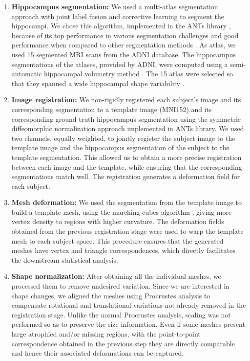 \begin{enumerate}
    \item \textbf{Hippocampus segmentation:} We used a multi-atlas segmentation approach with joint label fusion and corrective learning \cite{Wang2013} to segment the hippocampi. We chose this algorithm, implemented in the ANTs library \cite{Avants2009}, because of its top performance in various segmentation challenges \cite{Wang2013} and good performance when compared to other segmentation methods \cite{Dill2015}. As atlas, we used 15 segmented MRI scans from the ADNI database. The hippocampus segmentations of the atlases, provided by ADNI, were computed using a semi-automatic hippocampal volumetry method \cite{Hsu2002}. The 15 atlas were selected so that they spanned a wide hippocampal shape variability \cite{Sanroma2014}. \\
    
    \item \textbf{Image registration:} We non-rigidly registered each subject's image and its corresponding segmentation to a template image (MNI152) and its corresponding ground truth hippocampus segmentation using the symmetric diffeomorphic normalization approach \cite{Avants2008a} implemented in ANTs library. We used two channels, equally weighted, to jointly register the subject image to the template image and the hippocampus segmentation of the subject to the template segmentation. This allowed us to obtain a more precise registration between each image and the template, while ensuring that the corresponding segmentations match well. The registration generates a deformation field for each subject. \\
    
    \item \textbf{Mesh deformation:} We used the segmentation from the template image to build a template mesh, using the marching cubes algorithm \cite{Lorensen1987}, giving more vertex density to regions with higher curvature. The deformation fields obtained from the previous registration stage were used to warp the template mesh to each subject space. This procedure ensures that the generated meshes have vertex and triangle correspondences, which directly facilitates the downstream statistical analysis. \\

    \item \textbf{Shape normalization:} After obtaining all the individual meshes, we processed them to remove undesired variation. Since we are interested in shape changes, we aligned the meshes using Procrustes analysis \cite{Gower1975} to compensate rotational and translational variations not already removed in the registration stage. Unlike the normal Procrustes analysis, scaling was not performed so as to preserve the size information. Even if some meshes present large atrophied and/or missing regions, with the point-to-point correspondence obtained in the previous step they are directly comparable and hence their associated deformations can be captured.
    
\end{enumerate}


